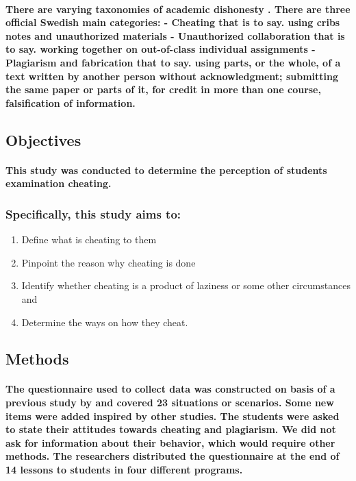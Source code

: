\documentclass[11pt]{article}
\begin{document}
	 \paragraph{There are varying  taxonomies of academic dishonesty \cite{DUMMY:2}. There are three official Swedish main categories: - Cheating that is to say. using cribs notes and unauthorized materials - Unauthorized collaboration that is to say. working together on out-of-class individual assignments - Plagiarism and fabrication that to say. using parts, or the whole, of a text written by another person without acknowledgment; submitting the same paper or parts of it, for credit in more than one course, falsification of information.}
	 
	 \subsection{Objectives}
	   \paragraph{This study was conducted to determine the perception of students examination cheating.}
	   
	   \subsubsection{Specifically, this study aims to:}
	   \begin{enumerate}
	   	
	   \item Define what is cheating to them
	   \item Pinpoint the reason why cheating is done
	   \item Identify whether cheating is a product of laziness or some other circumstances and 
	   \item Determine the ways on how they cheat.
	   	
	   \end{enumerate}
	  
	   
	   
	   \subsection{Methods}
	   \paragraph{The questionnaire used to collect data was constructed on basis of a previous study by \cite{DUMMY:1} and covered 23 situations or scenarios. Some new items were added inspired by other studies. The students were asked to state their attitudes towards cheating and plagiarism. We did not ask for information about their behavior, which would require other methods. The researchers distributed the questionnaire at the end of 14 lessons to students in four different programs.}
	   
\end{document}
